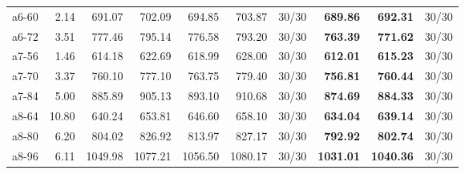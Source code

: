 \documentclass[aspectratio=1610]{beamer}
\begin{document}
\begin{frame}
\begin{table}[]
{\begin{tabular}{lrrrrrrrrr}
a6-60                                          & 2.14              & 691.07  & \multicolumn{1}{r|}{702.09}   & 694.85  & 703.87   & \multicolumn{1}{r|}{30/30} & \textbf{689.86}  & {\color[HTML]{FE0000} \textbf{692.31}}  & 30/30 \\
a6-72                                          & 3.51              & 777.46  & \multicolumn{1}{r|}{795.14}   & 776.58  & 793.20   & \multicolumn{1}{r|}{30/30} & \textbf{763.39}  & {\color[HTML]{FE0000} \textbf{771.62}}  & 30/30 \\
a7-56                                          & 1.46              & 614.18  & \multicolumn{1}{r|}{622.69}   & 618.99  & 628.00   & \multicolumn{1}{r|}{30/30} & \textbf{612.01}  & {\color[HTML]{FE0000} \textbf{615.23}}  & 30/30 \\
a7-70                                          & 3.37              & 760.10  & \multicolumn{1}{r|}{777.10}   & 763.75  & 779.40   & \multicolumn{1}{r|}{30/30} & \textbf{756.81}  & {\color[HTML]{FE0000} \textbf{760.44}}  & 30/30 \\
a7-84                                          & 5.00              & 885.89  & \multicolumn{1}{r|}{905.13}   & 893.10  & 910.68   & \multicolumn{1}{r|}{30/30} & \textbf{874.69}  & {\color[HTML]{FE0000} \textbf{884.33}}  & 30/30 \\
a8-64                                          & 10.80             & 640.24  & \multicolumn{1}{r|}{653.81}   & 646.60  & 658.10   & \multicolumn{1}{r|}{30/30} & \textbf{634.04}  & {\color[HTML]{FE0000} \textbf{639.14}}  & 30/30 \\
a8-80                                          & 6.20              & 804.02  & \multicolumn{1}{r|}{826.92}   & 813.97  & 827.17   & \multicolumn{1}{r|}{30/30} & \textbf{792.92}  & {\color[HTML]{FE0000} \textbf{802.74}}  & 30/30 \\
a8-96                                          & 6.11              & 1049.98 & \multicolumn{1}{r|}{1077.21}  & 1056.50 & 1080.17  & \multicolumn{1}{r|}{30/30} & \textbf{1031.01} & {\color[HTML]{FE0000} \textbf{1040.36}} & 30/30 \\ \hline
\end{tabular}%
}
\end{table}

\end{frame}
\end{document}
